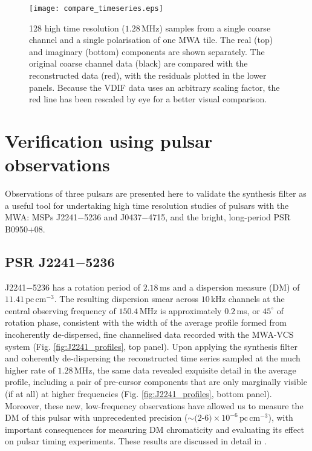 \documentclass{pasa}%
\newcommand{\psrslowB}{B0950$+$08}
\newcommand{\psrkaurJ}{J2241$-$5236}
\newcommand{\psrbhatJ}{J0437$-$4715}
\newcommand{\dmunits}{\ensuremath{\text{pc}\,\text{cm}^{-3}}}
\begin{document}
\begin{figure}
    \centering
    \texttt{[image: compare\_timeseries.eps]}
    \caption{128 high time resolution ($1.28\,$MHz) samples from a single coarse channel and a single polarisation of one MWA tile. The real (top) and imaginary (bottom) components are shown separately. The original coarse channel data (black) are compared with the reconstructed data (red), with the residuals plotted in the lower panels. Because the VDIF data uses an arbitrary scaling factor, the red line has been rescaled by eye for a better visual comparison.}
    \label{fig:compare_timeseries}
\end{figure}

\section{Verification using pulsar observations}
\label{sec:pulsardata}

Observations of three pulsars are presented here to validate the synthesis filter as a useful tool for undertaking high time resolution studies of pulsars with the MWA: MSPs \psrkaurJ{} and \psrbhatJ{}, and the bright, long-period PSR \psrslowB{}.

\subsection{PSR \psrkaurJ{}}

\psrkaurJ{} has a rotation period of $2.18\,$ms and a dispersion measure (DM) of $11.41\,\dmunits$.
The resulting dispersion smear across $10\,$kHz channels at the central observing frequency of $150.4\,$MHz is approximately $0.2\,$ms, or $45^\circ$ of rotation phase, consistent with the width of the average profile formed from incoherently de-dispersed, fine channelised data recorded with the MWA-VCS system (Fig. \ref{fig:J2241_profiles}, top panel).
Upon applying the synthesis filter and coherently de-dispersing the reconstructed time series sampled at the much higher rate of $1.28\,$MHz, the same data revealed exquisite detail in the average profile, including a pair of pre-cursor components that are only marginally visible (if at all) at higher frequencies (Fig. \ref{fig:J2241_profiles}, bottom panel).
Moreover, these new, low-frequency observations have allowed us to measure the DM of this pulsar with unprecedented precision ($\sim (2$-$6) \times 10^{-6}\,\dmunits$), with important consequences for measuring DM chromaticity and evaluating its effect on pulsar timing experiments.
These results are discussed in detail in \citet{Kaur2019}.
\end{document}
